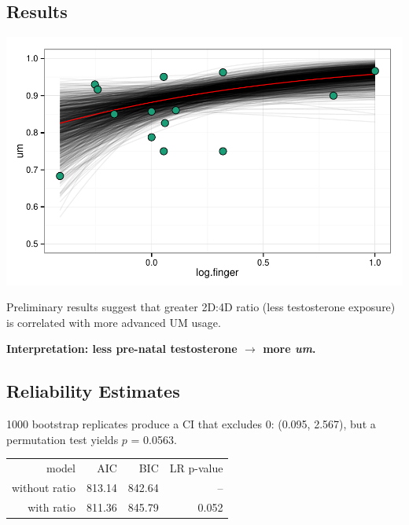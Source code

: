 \documentclass[a0,portrait]{a0poster}
\begin{document}
\begin{multicols}{2}


\section*{Results}

\begin{minipage}[c]{0.70\linewidth}
\includegraphics[width=1\linewidth]{finger_effect.pdf}
\end{minipage}
%
\begin{minipage}[c]{0.25\linewidth}
\large
Preliminary results suggest that greater 2D:4D ratio (less testosterone exposure) is correlated with more advanced UM usage.
\end{minipage}

\begin{center}
\noindent\textbf{Interpretation: less pre-natal testosterone $\rightarrow$ more \textsl{um}.}
\end{center}

\subsection*{Reliability Estimates}
1000 bootstrap replicates produce a CI that excludes 0: (0.095,  2.567), but a permutation test yields $p$ = 0.0563.

\begin{center}
\begin{tabular}{rrrr}
\toprule
	model & AIC & BIC & LR p-value\\
	\cmidrule{2-4}
without ratio & 813.14 & 842.64 & -- \\
with ratio &  811.36 & 845.79 & 0.052\\
\bottomrule
\end{tabular}
\end{center}


\end{multicols}
\end{document}
